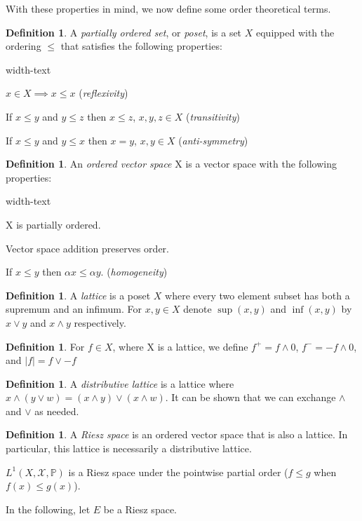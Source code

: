 \documentclass[letterpaper,10pt,oneside,onecolumn,reqno]{amsart}
\renewcommand{\P}{\mathbb P}
\newcommand{\X}{\mathcal X}
\theoremstyle{definition}
\newtheorem{defn}[thm]{Definition}
\begin{document}
With these properties in mind, we now define some order theoretical terms.

	
\begin{defn}
A \emph{partially ordered set}, or \emph{poset}, is a set $X$ equipped with the ordering $\leq$ that satisfies the following properties:

\begin{deflist}{width-text}
\item $x \in X \implies x \leq x$ (\emph{reflexivity})
\item If $x \leq y$ and $y \leq z$ then $x \leq z$, $x,y,z \in X$ (\emph{transitivity})
\item If $x \leq y$ and $y \leq x$ then $x = y$, $x,y \in X$ (\emph{anti-symmetry})
\end{deflist}
\end{defn}

\begin{defn}
An \emph{ordered vector space} X is a vector space with the following properties:

\begin{deflist}{width-text}
\item X is partially ordered.
\item Vector space addition preserves order.
\item If $x \leq y$ then $\alpha x \leq \alpha y$. (\emph{homogeneity})
\end{deflist}
\end{defn}

\begin{defn}

A \emph{lattice} is a poset $X$ where every two element subset has both a supremum and an infimum. For $x, y \in X$ denote $\sup(x,y)$ and $\inf(x,y)$ by $x \vee y$ and $x \wedge y$ respectively. 
\end{defn}

\begin{defn}
For $f \in X$, where X is a lattice, we define $f^+=f \wedge 0$, $f^-=-f \wedge 0$, and $|f| = f \vee -f$
\end{defn}

\begin{defn}
A \emph{distributive lattice} is a lattice where $x \wedge (y \vee w) = (x \wedge y) \vee (x \wedge w)$. It can be shown that we can exchange $\wedge$ and $\vee$ as needed.
\end{defn}

\begin{defn}
  A \emph{Riesz space} is an ordered vector space that is also a lattice. In particular, this lattice is necessarily a distributive lattice.

$L^1(X,\X,\P)$ is a Riesz space under the pointwise partial order ($f \leq g$ when $f(x) \leq g(x)$).

\end{defn}
In the following, let $E$ be a Riesz space.
\end{document}
